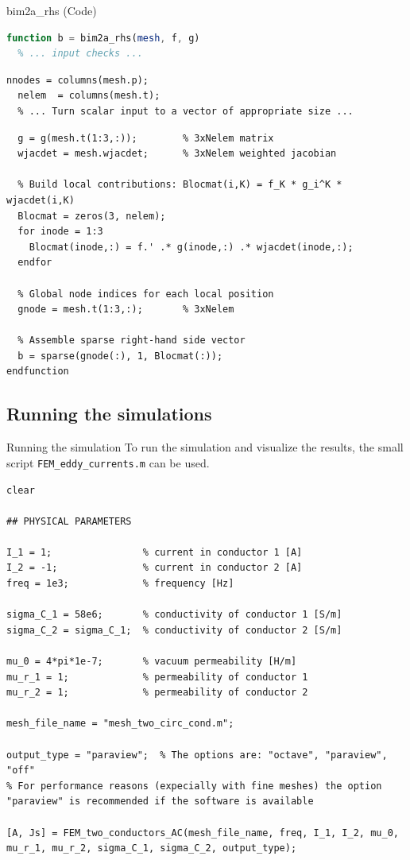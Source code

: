 \documentclass[aspectratio=54,xcolor=dvipsnames]{beamer}
\begin{document}
\begin{frame}[fragile]{bim2a\_rhs (Code)}
\scriptsize
\begin{lstlisting}[language=Octave,firstnumber=40]
function b = bim2a_rhs(mesh, f, g)
  % ... input checks ...
\end{lstlisting}
\begin{lstlisting}[firstnumber=50]
  nnodes = columns(mesh.p);
  nelem  = columns(mesh.t);
  % ... Turn scalar input to a vector of appropriate size ...
\end{lstlisting}
\begin{lstlisting}[firstnumber=68]
  % Extract g at each element's nodes
  g = g(mesh.t(1:3,:));        % 3xNelem matrix
  wjacdet = mesh.wjacdet;      % 3xNelem weighted jacobian

  % Build local contributions: Blocmat(i,K) = f_K * g_i^K * wjacdet(i,K)
  Blocmat = zeros(3, nelem);
  for inode = 1:3
    Blocmat(inode,:) = f.' .* g(inode,:) .* wjacdet(inode,:);
  endfor

  % Global node indices for each local position
  gnode = mesh.t(1:3,:);       % 3xNelem

  % Assemble sparse right-hand side vector
  b = sparse(gnode(:), 1, Blocmat(:));
endfunction
\end{lstlisting}
\end{frame}

\subsection{Running the simulations}
\begin{frame}[fragile]{Running the simulation}
To run the simulation and visualize the results, the small script \texttt{FEM\_eddy\_currents.m} can be used. 
\begin{lstlisting}[firstnumber=1]
clear

## PHYSICAL PARAMETERS

I_1 = 1;                % current in conductor 1 [A]
I_2 = -1;               % current in conductor 2 [A]
freq = 1e3;             % frequency [Hz]

sigma_C_1 = 58e6;       % conductivity of conductor 1 [S/m]
sigma_C_2 = sigma_C_1;  % conductivity of conductor 2 [S/m]

mu_0 = 4*pi*1e-7;       % vacuum permeability [H/m]
mu_r_1 = 1;             % permeability of conductor 1
mu_r_2 = 1;             % permeability of conductor 2

mesh_file_name = "mesh_two_circ_cond.m";

output_type = "paraview";  % The options are: "octave", "paraview", "off"
% For performance reasons (expecially with fine meshes) the option "paraview" is recommended if the software is available

[A, Js] = FEM_two_conductors_AC(mesh_file_name, freq, I_1, I_2, mu_0, mu_r_1, mu_r_2, sigma_C_1, sigma_C_2, output_type);
\end{lstlisting}
\end{frame}
\end{document}

